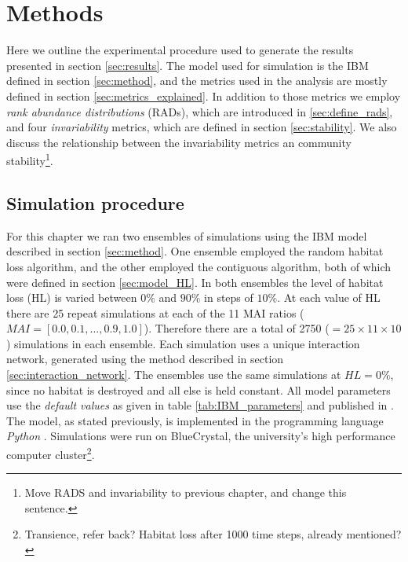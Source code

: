 

\section{Methods}
\label{sec:methods}

Here we outline the experimental procedure used to generate the results presented in section \ref{sec:results}. The model used for simulation is the IBM defined in section \ref{sec:method}, and the metrics used in the analysis are mostly defined in section \ref{sec:metrics_explained}. In addition to those metrics we employ \emph{rank abundance distributions} (RADs), which are introduced in \ref{sec:define_rads}, and four \emph{invariability} metrics, which are defined in section \ref{sec:stability}. We also discuss the relationship between the invariability metrics an community stability\footnote{Move RADS and invariability to previous chapter, and change this sentence.}.

\subsection{Simulation procedure}
\label{sec:simulation_procedure}

For this chapter we ran two ensembles of simulations using the IBM model described in section \ref{sec:method}. One ensemble employed the random habitat loss algorithm, and the other employed the contiguous algorithm, both of which were defined in section \ref{sec:model_HL}. In both ensembles the level of habitat loss (HL) is varied between $0\%$ and $90\%$ in steps of $10\%$. At each value of HL there are 25 repeat simulations at each of the 11 MAI ratios ($MAI=[0.0,0.1,...,0.9,1.0]$). Therefore there are a total of 2750 ($=25 \times 11 \times 10$) simulations in each ensemble. Each simulation uses a unique interaction network, generated using the method described in section \ref{sec:interaction_network}. The ensembles use the same simulations at $HL=0\%$, since no habitat is destroyed and all else is held constant. All model parameters use the \emph{default values} as given in table \ref{tab:IBM_parameters} and published in \cite{lurgi2015effects}. The model, as stated previously, is implemented in the programming language \emph{Python} \cite{python}. Simulations were run on BlueCrystal, the university's high performance computer cluster\footnote{Transience, refer back? Habitat loss after 1000 time steps, already mentioned?}.   


